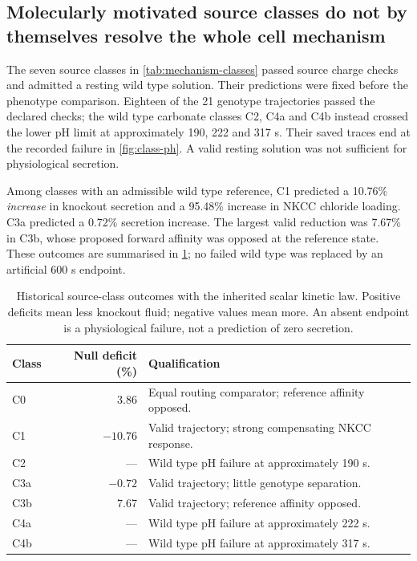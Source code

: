 \documentclass[11pt]{article}
\begin{document}
\subsection{Molecularly motivated source classes do not by themselves resolve the whole cell mechanism}
\label{sec:catalan-results}

The seven source classes in \cref{tab:mechanism-classes} passed source charge checks and admitted a resting wild type solution. Their predictions were fixed before the phenotype comparison. Eighteen of the 21 genotype trajectories passed the declared checks; the wild type carbonate classes C2, C4a and C4b instead crossed the lower pH limit at approximately 190, 222 and 317 s. Their saved traces end at the recorded failure in \cref{fig:class-ph}. A valid resting solution was not sufficient for physiological secretion.

Among classes with an admissible wild type reference, C1 predicted a 10.76\% \emph{increase} in knockout secretion and a 95.48\% increase in NKCC chloride loading. C3a predicted a 0.72\% secretion increase. The largest valid reduction was 7.67\% in C3b, whose proposed forward affinity was opposed at the reference state. These outcomes are summarised in \cref{tab:class-outcomes}; no failed wild type was replaced by an artificial 600 s endpoint.

\begin{table}[t]
\centering
\caption{Historical source-class outcomes with the inherited scalar kinetic law. Positive deficits mean less knockout fluid; negative values mean more. An absent endpoint is a physiological failure, not a prediction of zero secretion.}
\label{tab:class-outcomes}
\begin{tabularx}{\textwidth}{l r X}
\toprule
Class & Null deficit (\%) & Qualification\\
\midrule
C0 & 3.86 & Equal routing comparator; reference affinity opposed.\\
C1 & $-10.76$ & Valid trajectory; strong compensating NKCC response.\\
C2 & --- & Wild type pH failure at approximately 190 s.\\
C3a & $-0.72$ & Valid trajectory; little genotype separation.\\
C3b & 7.67 & Valid trajectory; reference affinity opposed.\\
C4a & --- & Wild type pH failure at approximately 222 s.\\
C4b & --- & Wild type pH failure at approximately 317 s.\\
\bottomrule
\end{tabularx}
\end{table}
\end{document}
